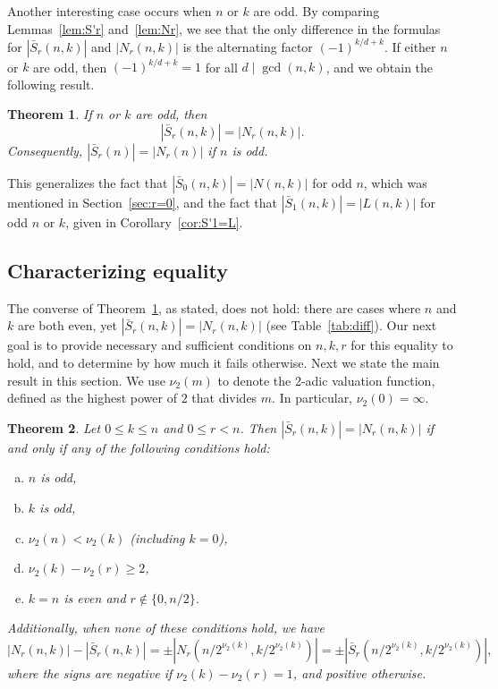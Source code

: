 \documentclass[12pt]{article}
\newcommand{\card}[1]{\left|#1\right|}
\newcommand{\bS}{\bar{S}}
\newtheorem{theorem}{Theorem}[section]
\theoremstyle{definition}
\begin{document}
Another interesting case occurs when $n$ or $k$ are odd. By comparing Lemmas~\ref{lem:S'r} and~\ref{lem:Nr}, we see that the only difference in the formulas for $\card{\bS_r(n, k)}$ and $\card{N_r(n, k)}$ is the alternating factor $(-1)^{k/d + k}$. 
If either $n$ or $k$ are odd, then $(-1)^{k/d + k} = 1$ for all $d \mid \gcd(n, k)$, and we obtain the following result.

\begin{theorem}\label{thm:odd_nk}
    If $n$ or $k$ are odd, then $$\card{\bS_r(n, k)} = \card{N_r(n,
    k)}.$$ Consequently, $\card{\bS_r(n)} = \card{N_r(n)}$ if $n$ is odd.
\end{theorem}

This generalizes the fact that $\card{\bS_0(n, k)} = \card{N(n, k)}$ for odd $n$, which was mentioned in Section~\ref{sec:r=0}, and the fact that 
$\card{\bS_1(n, k)} = \card{L(n, k)}$ for odd $n$ or $k$, given in Corollary~\ref{cor:S'1=L}. 

\subsection{Characterizing equality}

The converse of Theorem~\ref{thm:odd_nk}, as stated, does not hold:
there are cases where $n$ and $k$ are both even, yet $\card{\bS_r(n, k)} = \card{N_r(n, k)}$ (see Table~\ref{tab:diff}).
Our next goal is to provide necessary and sufficient conditions on $n,k,r$ for this equality to hold, and to determine by how much it fails otherwise. Next we state the main result in this section.
We use $\nu_2(m)$ to denote the 2-adic valuation function, defined as the highest power of $2$ that divides $m$. In particular, $\nu_2(0)=\infty$.

\begin{theorem}\label{thm:Nr=S'r}
   Let $0\le k\le n$ and $0\le r< n$. Then $\card{\bS_r(n, k)} = \card{N_r(n, k)}$ if and only if any of the following conditions hold:
    \begin{enumerate}[(a)]
        \item $n$ is odd,
        \item $k$ is odd,
        \item $\nu_2(n) < \nu_2(k)$ (including $k = 0$),
        \item $\nu_2(k) - \nu_2(r) \geq 2$,
        \item $k = n$ is even and $r \notin \{0, n / 2\}$.
    \end{enumerate}
    Additionally, when none of these conditions hold, we have 
    \begin{equation}\label{eq:difference}
        \card{N_r(n, k)} - \card{\bS_r(n, k)}= \pm \card{N_r(n/2^{\nu_2(k)}, k/2^{\nu_2(k)})}
        =
        \pm \card{\bS_r(n/2^{\nu_2(k)}, k/2^{\nu_2(k)})},
    \end{equation}
    where the signs are negative if $\nu_2(k) - \nu_2(r) =1$, and positive otherwise.
\end{theorem}
\end{document}
